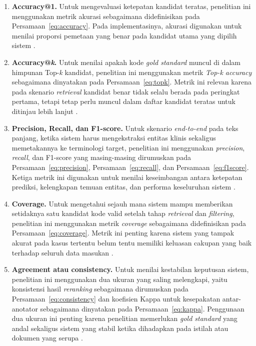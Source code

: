 \begin{enumerate}
    \item \textbf{Accuracy@1.} Untuk mengevaluasi ketepatan kandidat teratas, penelitian ini menggunakan metrik akurasi sebagaimana didefinisikan pada Persamaan~\ref{eq:accuracy}. Pada implementasinya, akurasi digunakan untuk menilai proporsi pemetaan yang benar pada kandidat utama yang dipilih sistem \citep{chen_clinical_2020,gilani_cde-mapper_2025}.

    \item \textbf{Accuracy@\textit{k}.} Untuk menilai apakah kode \textit{gold standard} muncul di dalam himpunan Top-\textit{k} kandidat, penelitian ini menggunakan metrik \textit{Top-k accuracy} sebagaimana dinyatakan pada Persamaan~\ref{eq:topk}. Metrik ini relevan karena pada skenario \textit{retrieval} kandidat benar tidak selalu berada pada peringkat pertama, tetapi tetap perlu muncul dalam daftar kandidat teratas untuk ditinjau lebih lanjut \citep{he_bertmap_2022,gilani_cde-mapper_2025,park_development_2026}.

    \item \textbf{Precision, Recall, dan F1-score.} Untuk skenario \textit{end-to-end} pada teks panjang, ketika sistem harus mengekstraksi entitas klinis sekaligus memetakannya ke terminologi target, penelitian ini menggunakan \textit{precision}, \textit{recall}, dan F1-score yang masing-masing dirumuskan pada Persamaan~\ref{eq:precision}, Persamaan~\ref{eq:recall}, dan Persamaan~\ref{eq:f1score}. Ketiga metrik ini digunakan untuk menilai keseimbangan antara ketepatan prediksi, kelengkapan temuan entitas, dan performa keseluruhan sistem \citep{chen_clinical_2020}.

    \item \textbf{Coverage.} Untuk mengetahui sejauh mana sistem mampu memberikan setidaknya satu kandidat kode valid setelah tahap \textit{retrieval} dan \textit{filtering}, penelitian ini menggunakan metrik \textit{coverage} sebagaimana didefinisikan pada Persamaan~\ref{eq:coverage}. Metrik ini penting karena sistem yang tampak akurat pada kasus tertentu belum tentu memiliki keluasan cakupan yang baik terhadap seluruh data masukan \citep{gilani_cde-mapper_2025,park_development_2026}.

    \item \textbf{Agreement atau consistency.} Untuk menilai kestabilan keputusan sistem, penelitian ini menggunakan dua ukuran yang saling melengkapi, yaitu konsistensi hasil \textit{reranking} sebagaimana dirumuskan pada Persamaan~\ref{eq:consistency} dan koefisien Kappa untuk kesepakatan antar-anotator sebagaimana dinyatakan pada Persamaan~\ref{eq:kappa}. Penggunaan dua ukuran ini penting karena penelitian memerlukan \textit{gold standard} yang andal sekaligus sistem yang stabil ketika dihadapkan pada istilah atau dokumen yang serupa \citep{januel_improved_2011,gilani_cde-mapper_2025}.


\end{enumerate}
